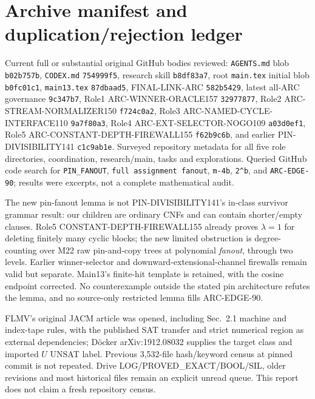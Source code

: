 \documentclass[11pt]{article}
\begin{document}
\section{Archive manifest and duplication/rejection ledger}
Current full or substantial original GitHub bodies reviewed: \texttt{AGENTS.md} blob \texttt{b02b757b}, \texttt{CODEX.md} \texttt{754999f5}, research skill \texttt{b8df83a7}, root \texttt{main.tex} initial blob \texttt{b0fc01c1}, \texttt{main13.tex} \texttt{87dbaad5}, FINAL-LINK-ARC \texttt{582b5429}, latest all-ARC governance \texttt{9c347b7}, Role1 ARC-WINNER-ORACLE157 \texttt{32977877}, Role2 ARC-STREAM-NORMALIZER150 \texttt{f724c0a2}, Role3 ARC-NAMED-CYCLE-INTERFACE110 \texttt{9a7f80a3}, Role4 ARC-EXT-SELECTOR-NOGO109 \texttt{a03d0ef1}, Role5 ARC-CONSTANT-DEPTH-FIREWALL155 \texttt{f62b9c6b}, and earlier PIN-DIVISIBILITY141 \texttt{c1c9ab1e}. Surveyed repository metadata for all five role directories, coordination, research/main, tasks and explorations. Queried GitHub code search for \texttt{PIN\_FANOUT}, \texttt{full assignment fanout}, \texttt{m-4b}, \texttt{2\^{}b}, and \texttt{ARC-EDGE-90}; results were excerpts, not a complete mathematical audit.

The new pin-fanout lemma is not PIN-DIVISIBILITY141's in-class survivor grammar result: our children are ordinary CNFs and can contain shorter/empty clauses. Role5 CONSTANT-DEPTH-FIREWALL155 already proves $\lambda=1$ for deleting finitely many cyclic blocks; the new limited obstruction is degree-counting over M22 raw pin-and-copy trees at polynomial \emph{fanout}, through two levels. Earlier winner-selector and downward-extensional-channel firewalls remain valid but separate. Main13's finite-hit template is retained, with the cosine endpoint corrected. No counterexample outside the stated pin architecture refutes the lemma, and no source-only restricted lemma fills ARC-EDGE-90.

FLMV's original JACM article was opened, including Sec.~2.1 machine and index-tape rules, with the published SAT transfer and strict numerical region as external dependencies; D\"ocker arXiv:1912.08032 supplies the target class and imported $U$ UNSAT label. Previous 3,532-file hash/keyword census at pinned commit is not repeated. Drive LOG/PROVED\_EXACT/BOOL/SIL, older revisions and most historical files remain an explicit unread queue. This report does not claim a fresh repository census.
\end{document}
